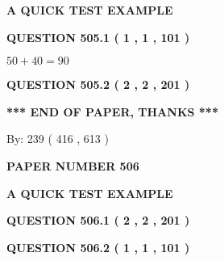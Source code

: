 \documentclass[12pt]{article}
\begin{document}
   
   
   
 \vspace{0.2in}
{\LARGE {\textbf{ A QUICK TEST EXAMPLE}}}
   
   
  
\vspace{0.2in}
  
{\textbf{\Large{QUESTION
505.1 
 ( 1 , 1 , 101 )
}}}
  
  
 
 

$ %
50 +  %
40=   %
90$
 
 
  
\vspace{0.2in}
  
{\textbf{\Large{QUESTION
505.2 
 ( 2 , 2 , 201 )
}}}
  
  
   
   
 \vspace{0.2in}
 
   
   
   
   
\vspace{1.0in} 
{\textbf{\large{ *** END OF PAPER, THANKS *** }}} 
   
   
\hspace{1.0in} By: 
 239 ( 416 ,  613 )
   
   
   
   
\newpage 
\setcounter{page}{ 
   506001 } 
   
   
   
   
 {\textbf{ \Large{ PAPER NUMBER  506  }}}
   
   
\vspace{0.2in}
   
   
   
   
   
   
 \vspace{0.2in}
{\LARGE {\textbf{ A QUICK TEST EXAMPLE}}}
   
   
  
\vspace{0.2in}
  
{\textbf{\Large{QUESTION
506.1 
 ( 2 , 2 , 201 )
}}}
  
  
  
\vspace{0.2in}
  
{\textbf{\Large{QUESTION
506.2 
 ( 1 , 1 , 101 )
}}}
  
\end{document}
